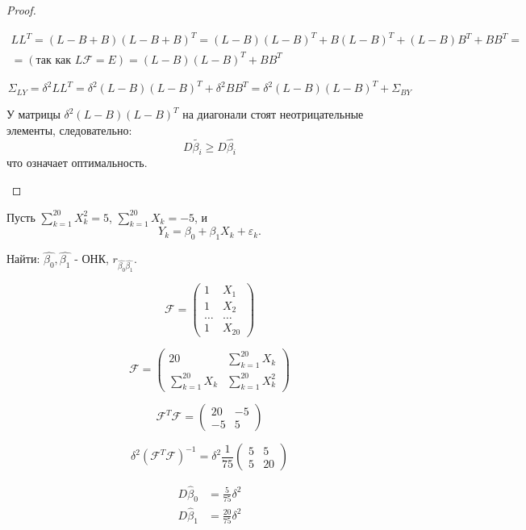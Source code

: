 \begin{proof}
\begin{enumerate}
      \begin{multline*}
        LL^T = (L-B+B) (L-B+B)^T = (L-B)(L-B)^T + B (L-B)^T + (L-B) B^T + BB^T = \\
        = (\text{так как $L\mathcal{F} = E$}) = (L-B)(L-B)^T + BB^T
      \end{multline*}

      \[
        \Sigma_{LY} = \delta^2 LL^T = \delta^2 (L-B)(L-B)^T + \delta^2 BB^T = \delta^2 (L-B)(L-B)^T + \Sigma_{BY}
      \]

      У матрицы $\delta^2 (L-B)(L-B)^T$ на диагонали стоят неотрицательные элементы, следовательно:
      \[
        D\tilde{\beta_i} \geqslant D\hat{\beta_i}
      \]
      что означает оптимальность.

  \end{enumerate}
\end{proof}

\begin{ex}
  Пусть $\sum_{k=1}^20 X_k^2 = 5$, $\sum_{k=1}^20 X_k= -5$, и
  \[
    Y_k = \beta_0 + \beta_1 X_k + \varepsilon_k.
  \]

  Найти: $\hat{\beta_0}, \hat{\beta_1}$ - ОНК, $r_{\hat{\beta_0} \hat{\beta_1}}$.

  \[
    \mathcal{F} = \begin{pmatrix}
      1 & X_1 \\
      1 & X_2 \\
      \dots & \dots \\
      1 & X_{20}
    \end{pmatrix}
  \]

  \[
    \mathcal{F} = \begin{pmatrix}
      20 & \sum_{k=1}^{20} X_k \\
      \sum_{k=1}^{20} X_k & \sum_{k=1}^{20} X_k^2
    \end{pmatrix}
  \]

  \[
    \mathcal{F}^T \mathcal{F} = \begin{pmatrix}
      20 & -5 \\
      -5 & 5
    \end{pmatrix}
  \]
  
  \[
    \delta^2 (\mathcal{F}^T \mathcal{F})^{-1} = \delta^2 \frac{1}{75} \begin{pmatrix}
      5 & 5 \\
      5 & 20
    \end{pmatrix}
  \]

  \begin{align*}
    D \hat{\beta}_0 &= \frac{5}{75} \delta^2 \\
    D \hat{\beta}_1 &= \frac{20}{75} \delta^2
  \end{align*}
\end{ex}

